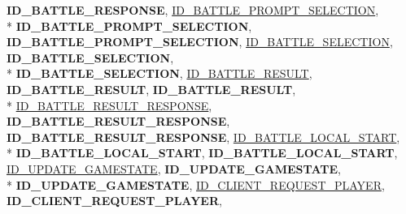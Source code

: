 \begin{DoxyCompactItemize}
{\bfseries I\-D\-\_\-\-B\-A\-T\-T\-L\-E\-\_\-\-R\-E\-S\-P\-O\-N\-S\-E}, 
\hyperlink{namespace_champ_net_plugin_a2ade5cfa7cf6c25ab7236c6b54a57821a1ce06c939b64517c251a1cc36168837f}{I\-D\-\_\-\-B\-A\-T\-T\-L\-E\-\_\-\-P\-R\-O\-M\-P\-T\-\_\-\-S\-E\-L\-E\-C\-T\-I\-O\-N}, 
\\*
{\bfseries I\-D\-\_\-\-B\-A\-T\-T\-L\-E\-\_\-\-P\-R\-O\-M\-P\-T\-\_\-\-S\-E\-L\-E\-C\-T\-I\-O\-N}, 
{\bfseries I\-D\-\_\-\-B\-A\-T\-T\-L\-E\-\_\-\-P\-R\-O\-M\-P\-T\-\_\-\-S\-E\-L\-E\-C\-T\-I\-O\-N}, 
\hyperlink{namespace_champ_net_plugin_a2ade5cfa7cf6c25ab7236c6b54a57821aaf35bd9b65c9b7d548147fbd85717bf9}{I\-D\-\_\-\-B\-A\-T\-T\-L\-E\-\_\-\-S\-E\-L\-E\-C\-T\-I\-O\-N}, 
{\bfseries I\-D\-\_\-\-B\-A\-T\-T\-L\-E\-\_\-\-S\-E\-L\-E\-C\-T\-I\-O\-N}, 
\\*
{\bfseries I\-D\-\_\-\-B\-A\-T\-T\-L\-E\-\_\-\-S\-E\-L\-E\-C\-T\-I\-O\-N}, 
\hyperlink{namespace_champ_net_plugin_a2ade5cfa7cf6c25ab7236c6b54a57821a744cf8458d36d27da738fcf6ba76001c}{I\-D\-\_\-\-B\-A\-T\-T\-L\-E\-\_\-\-R\-E\-S\-U\-L\-T}, 
{\bfseries I\-D\-\_\-\-B\-A\-T\-T\-L\-E\-\_\-\-R\-E\-S\-U\-L\-T}, 
{\bfseries I\-D\-\_\-\-B\-A\-T\-T\-L\-E\-\_\-\-R\-E\-S\-U\-L\-T}, 
\\*
\hyperlink{namespace_champ_net_plugin_a2ade5cfa7cf6c25ab7236c6b54a57821a0400430dae2bfdb56c3c5be84d5fc2b1}{I\-D\-\_\-\-B\-A\-T\-T\-L\-E\-\_\-\-R\-E\-S\-U\-L\-T\-\_\-\-R\-E\-S\-P\-O\-N\-S\-E}, 
{\bfseries I\-D\-\_\-\-B\-A\-T\-T\-L\-E\-\_\-\-R\-E\-S\-U\-L\-T\-\_\-\-R\-E\-S\-P\-O\-N\-S\-E}, 
{\bfseries I\-D\-\_\-\-B\-A\-T\-T\-L\-E\-\_\-\-R\-E\-S\-U\-L\-T\-\_\-\-R\-E\-S\-P\-O\-N\-S\-E}, 
\hyperlink{namespace_champ_net_plugin_a2ade5cfa7cf6c25ab7236c6b54a57821ab54454887b51006a69a632ca6a13aab6}{I\-D\-\_\-\-B\-A\-T\-T\-L\-E\-\_\-\-L\-O\-C\-A\-L\-\_\-\-S\-T\-A\-R\-T}, 
\\*
{\bfseries I\-D\-\_\-\-B\-A\-T\-T\-L\-E\-\_\-\-L\-O\-C\-A\-L\-\_\-\-S\-T\-A\-R\-T}, 
{\bfseries I\-D\-\_\-\-B\-A\-T\-T\-L\-E\-\_\-\-L\-O\-C\-A\-L\-\_\-\-S\-T\-A\-R\-T}, 
\hyperlink{namespace_champ_net_plugin_a2ade5cfa7cf6c25ab7236c6b54a57821a6c390584862af2434c946e375365fe02}{I\-D\-\_\-\-U\-P\-D\-A\-T\-E\-\_\-\-G\-A\-M\-E\-S\-T\-A\-T\-E}, 
{\bfseries I\-D\-\_\-\-U\-P\-D\-A\-T\-E\-\_\-\-G\-A\-M\-E\-S\-T\-A\-T\-E}, 
\\*
{\bfseries I\-D\-\_\-\-U\-P\-D\-A\-T\-E\-\_\-\-G\-A\-M\-E\-S\-T\-A\-T\-E}, 
\hyperlink{namespace_champ_net_plugin_a2ade5cfa7cf6c25ab7236c6b54a57821a95ea635e1f4775e77d635b7039a9711e}{I\-D\-\_\-\-C\-L\-I\-E\-N\-T\-\_\-\-R\-E\-Q\-U\-E\-S\-T\-\_\-\-P\-L\-A\-Y\-E\-R}, 
{\bfseries I\-D\-\_\-\-C\-L\-I\-E\-N\-T\-\_\-\-R\-E\-Q\-U\-E\-S\-T\-\_\-\-P\-L\-A\-Y\-E\-R}, 

\end{DoxyCompactItemize}
